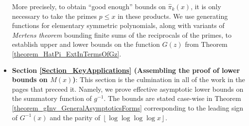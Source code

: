 \documentclass[11pt,reqno,a4letter]{article}
\numberwithin{figure}{section}
\numberwithin{table}{section}
\newcommand{\floor}[1]{\left\lfloor #1 \right\rfloor}
\theoremstyle{plain}
\numberwithin{theorem}{section}
\theoremstyle{definition}
\begin{document}
\begin{itemize}
           More precisely, to obtain ``good enough'' bounds on 
           $\widehat{\pi}_k(x)$, it is only necessary to take the primes $p \leq x$ in these 
           products. We use generating functions for elementary symmetric polynomials, along with 
           variants of \emph{Mertens theorem} bounding finite sums of the reciprocals of the primes, 
           to establish upper and lower bounds on the function $G(z)$ from 
           Theorem \ref{theorem_HatPi_ExtInTermsOfGz}. 
     \item \textbf{Section \ref{Section_KeyApplications} (Assembling the proof of lower bounds on $M(x)$)}: 
           This section is the culmination in all of the work in the pages that preceed it. 
           Namely, we prove effective asymptotic lower bounds on the summatory function of $g^{-1}$. 
           The bounds are stated case-wise in Theorem \ref{theorem_gInv_GeneralAsymptoticsForms} 
           corresponding to the leading sign of 
           $G^{-1}(x)$ and the parity of $\floor{\log\log\log\log x}$. 
           

\end{itemize}
\end{document}
